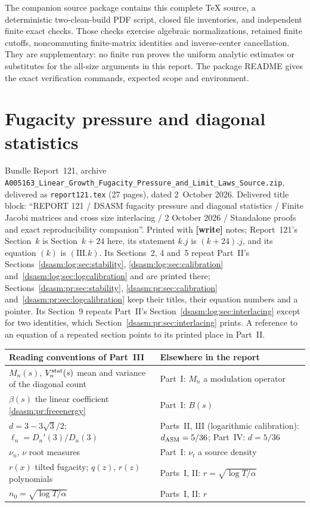 \documentclass[11pt,letterpaper]{article}
\theoremstyle{remark}\newtheorem{remark}[theorem]{Remark}
\newcommand{\file}[1]{\nolinkurl{#1}}
\newcommand{\partsource}[1]{\par\noindent\begin{minipage}{\textwidth}\small #1\end{minipage}\par\medskip}
\newcommand{\parteqs}[1]{\setcounter{equation}{0}%
 \renewcommand{\theequation}{#1\arabic{equation}}%
 \renewcommand{\theHequation}{#1\arabic{equation}}}
\begin{document}
The companion source package contains this complete TeX source,
a deterministic two-clean-build PDF script, closed file inventories,
and independent finite exact checks. Those checks exercise algebraic
normalizations, retained finite cutoffs, noncommuting finite-matrix
identities and inverse-center cancellation. They are supplementary:
no finite run proves the uniform analytic estimates or substitutes
for the all-size arguments in this report. The package README gives
the exact verification commands, expected scope and environment.
\clearpage
\part{Fugacity pressure and diagonal statistics}\label{dsasm:pr:part}
\parteqs{III.}
\partsource{Bundle Report~121, archive \file{A005163_Linear_Growth_Fugacity_Pressure_and_Limit_Laws_Source.zip}, delivered as \file{report121.tex} (27 pages), dated 2~October 2026. Delivered title block: ``REPORT 121 / DSASM fugacity pressure and diagonal statistics / Finite Jacobi matrices and cross size interlacing / 2 October 2026 / Standalone proofs and exact reproducibility companion''. Printed with \textbf{[write]} notes; Report~121's Section~$k$ is Section~$k+24$ here, its statement $k.j$ is $(k+24).j$, and its equation $(k)$ is $(\mathrm{III}.k)$. Its Sections~2, 4 and~5 repeat Part~II's Sections~\ref{dsasm:log:sec:stability}, \ref{dsasm:log:sec:calibration} and~\ref{dsasm:log:sec:logcalibration} and are printed there; Sections~\ref{dsasm:pr:sec:stability}, \ref{dsasm:pr:sec:calibration} and~\ref{dsasm:pr:sec:logcalibration} keep their titles, their equation numbers and a pointer. Its Section~9 repeats Part~II's Section~\ref{dsasm:log:sec:interlacing} except for two identities, which Section~\ref{dsasm:pr:sec:interlacing} prints. A reference to an equation of a repeated section points to its printed place in Part~II.}
\begin{center}
\small
\begin{tabular}{@{}>{\raggedright\arraybackslash}p{} >{\raggedright\arraybackslash}p{}@{}}
\toprule
Reading conventions of Part~III & Elsewhere in the report\\
\midrule
$M_n(s)$, $V_n^{\rm stat}(s)$ mean and variance of the diagonal count & Part~I: $M_n$ a modulation operator\\
$\beta(s)$ the linear coefficient \eqref{dsasm:pr:freeenergy} & Part~I: $B(s)$\\
$d=3-3\sqrt3/2$; $\ell_n=D_n'(3)/D_n(3)$ & Parts~II, III (logarithmic calibration): $d_{\rm ASM}=5/36$; Part~IV: $d=5/36$\\
$\nu_n$, $\nu$ root measures & Part~I: $\nu_t$ a source density\\
$r(x)$ tilted fugacity; $q(z)$, $r(z)$ polynomials & Parts~I, II: $r=\sqrt{\log T/\alpha}$\\
$n_0=\sqrt{\log T/\alpha}$ & Parts~I, II: $r$\\
\bottomrule
\end{tabular}
\end{center}
\end{document}
